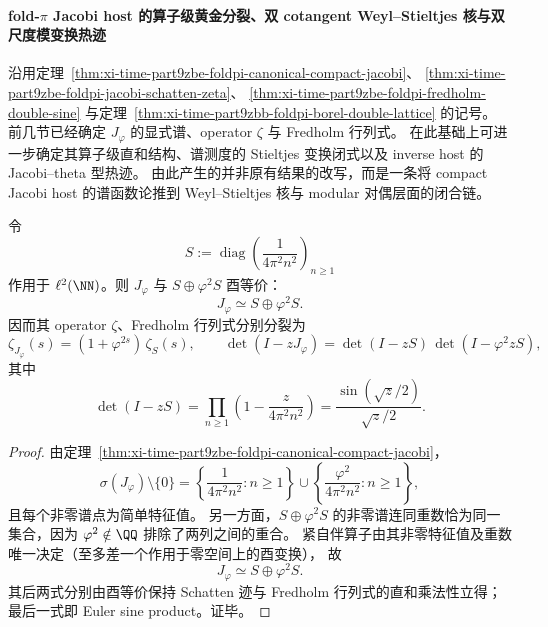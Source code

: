 \paragraph{fold-\texorpdfstring{$\pi$}{pi} Jacobi host 的算子级黄金分裂、双 cotangent Weyl--Stieltjes 核与双尺度模变换热迹}
沿用定理~\ref{thm:xi-time-part9zbe-foldpi-canonical-compact-jacobi}、
\ref{thm:xi-time-part9zbe-foldpi-jacobi-schatten-zeta}、
\ref{thm:xi-time-part9zbe-foldpi-fredholm-double-sine}
与定理~\ref{thm:xi-time-part9zbb-foldpi-borel-double-lattice} 的记号。
前几节已经确定 \(J_\varphi\) 的显式谱、operator \(\zeta\) 与 Fredholm 行列式。
在此基础上可进一步确定其算子级直和结构、谱测度的 Stieltjes 变换闭式以及 inverse host 的 Jacobi--theta 型热迹。
由此产生的并非原有结果的改写，而是一条将 compact Jacobi host 的谱函数论推到 Weyl--Stieltjes 核与 modular 对偶层面的闭合链。

\begin{theorem}\label{thm:xi-time-part9zbl-foldpi-golden-operator-splitting}
令
\[
S:=\operatorname{diag}\!\left(\frac{1}{4\pi^2n^2}\right)_{n\ge 1}
\]
作用于 \(\ell^2(\NN)\)。则 \(J_\varphi\) 与 \(S\oplus \varphi^2 S\) 酉等价：
\[
J_\varphi \simeq S\oplus \varphi^2 S.
\]
因而其 operator \(\zeta\)、Fredholm 行列式分别分裂为
\[
\zeta_{J_\varphi}(s)=(1+\varphi^{2s})\,\zeta_S(s),
\qquad
\det(I-zJ_\varphi)=\det(I-zS)\,\det(I-\varphi^2 zS),
\]
其中
\[
\det(I-zS)
=\prod_{n\ge 1}\left(1-\frac{z}{4\pi^2n^2}\right)
=\frac{\sin(\sqrt z/2)}{\sqrt z/2}.
\]
\end{theorem}
\begin{proof}
由定理~\ref{thm:xi-time-part9zbe-foldpi-canonical-compact-jacobi}，
\[
\sigma(J_\varphi)\setminus\{0\}
=
\left\{\frac{1}{4\pi^2n^2}:n\ge 1\right\}
\cup
\left\{\frac{\varphi^2}{4\pi^2n^2}:n\ge 1\right\},
\]
且每个非零谱点为简单特征值。
另一方面，\(S\oplus \varphi^2 S\) 的非零谱连同重数恰为同一集合，因为 \(\varphi^2\notin\QQ\) 排除了两列之间的重合。
紧自伴算子由其非零特征值及重数唯一决定（至多差一个作用于零空间上的酉变换），
故
\[
J_\varphi\simeq S\oplus\varphi^2 S.
\]
其后两式分别由酉等价保持 Schatten 迹与 Fredholm 行列式的直和乘法性立得；最后一式即 Euler sine product。证毕。
\end{proof}

